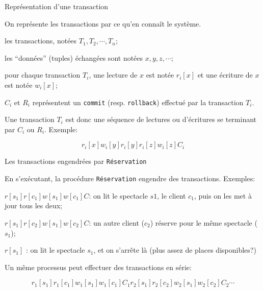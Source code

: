 \begin{frame}{Représentation d'une transaction}

On représente les transactions par ce qu'en connaît le système.

\begin{redbullet}
   \item les transactions, notées $T_1, T_2, \cdots, T_n$;
   \item les ``données'' (tuples) échangées sont notées $x, y, z, \cdots$;
   \item pour chaque transaction $T_i$, une lecture de $x$ est notée $r_i[x]$ 
     et une écriture de $x$ est notée $w_i[x]$;
   \item $C_i$ et $R_i$ représentent un \texttt{commit} (resp. \texttt{rollback}) 
       effectué par la transaction $T_i$.
\end{redbullet}
  
  \vfill
\begin{blocgauche}
  \alert{Une transaction $T_i$ est donc une séquence de lectures ou 
  d'écritures se terminant par $C_i$ ou $R_i$}. Exemple:
  
  $$r_i[x] w_i[y] r_i[y] r_i[z] w_i[z] C_i$$
\end{blocgauche}
\end{frame}

\begin{frame}{Les transactions engendrées par \texttt{Réservation}}

En s'exécutant, la procédure \texttt{Réservation} engendre des transactions. Exemples:

\begin{redbullet}
  \item $r[s_1]r[c_1]w[s_1]w[c_1]C$: on lit le spectacle $s1$, le client $c_1$, 
      puis on les met à jour tous les deux;
     
   \item  $r[s_1]r[c_2]w[s_1]w[c_2]C$: un autre client ($c_2$) réserve pour le même spectacle
      ($s_1$);
      
  \item $r[s_1]$ : on lit le spectacle $s_1$, et on s'arrête là (plus assez de places disponibles?)
 
\end{redbullet}
\vfill
\begin{blocgauche}
Un même processus peut effectuer des transactions \alert{en série}:

      $$r_1[s_1]r_1[c_1]w_1[s_1]w_1[c_1] C_1 r_2[s_1]r_2[c_2]w_2[s_1]w_2[c_2] C_2 \cdots$$
\end{blocgauche}
\end{frame}

